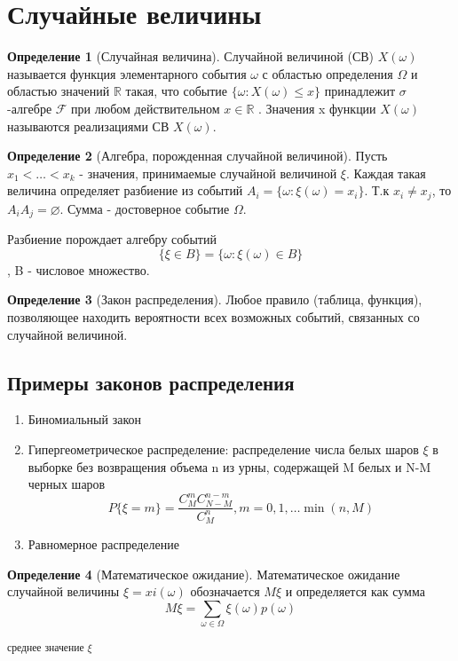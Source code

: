 \documentclass[a4paper]{article}
\theoremstyle{definition}
\newtheorem*{definition}{Определение}
\theoremstyle{remark}
\begin{document}
\section{Случайные величины}
\begin{definition}[Случайная величина]
    Случайной величиной (СВ) $X(\omega)$ называется функция элементарного события $\omega$ с областью определения $\Omega$
и областью значений $\mathbb{R}$ такая, что событие $\{\omega : X(\omega) \leq x\}$ принадлежит $\sigma$ -алгебре $\mathcal{F}$ при любом действительном $x \in \mathbb{R}$ . Значения x функции $X(\omega)$ называются реализациями СВ $X(\omega)$.    
\end{definition}
\begin{definition}[Алгебра, порожденная случайной величиной]
    Пусть $x_1< \dots< x_k$ - значения, принимаемые случайной величиной $\xi$. Каждая такая
    величина определяет разбиение из событий $A_i = \{\omega : \xi(\omega) = x_i\}$.
    Т.к $x_i\neq x_j$, то $A_i A_j = \varnothing$. Сумма - достоверное событие $\Omega$.

    Разбиение порождает алгебру событий \[\{\xi \in B \} = \{\omega: \xi (\omega) \in B\} \],
    B - числовое множество. 
\end{definition}
\begin{definition}[Закон распределения]
    Любое правило (таблица, функция), позволяющее находить вероятности всех возможных событий, связанных со случайной величиной.
\end{definition}

\subsection{Примеры законов распределения}
\begin{enumerate}
    \item Биномиальный закон
    \item Гипергеометрическое распределение:
    распределение числа белых шаров $\xi$ в выборке без возвращения объема n из урны, содержащей M белых и N-M черных шаров 
    \[P \{\xi = m\} = \frac{C^m_M C^{n-m}_{N-M}}{C_M^n}, m = 0, 1, \dots \min(n, M)\]
    \item Равномерное распределение
\end{enumerate}

\begin{definition}[Математическое ожидание]
    Математическое ожидание случайной величины $\xi = xi(\omega)$ обозначается $M\xi$ и определяется как сумма
    \[M\xi = \sum_{\omega \in \Omega} \xi(\omega) p(\omega)\]
\end{definition}
\textsubscript{среднее значение $\xi$}
\end{document}
